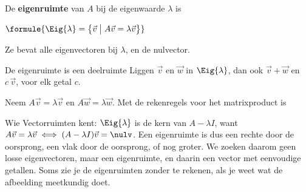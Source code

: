 \begin{theorie}
De \textbf{\textcolor{accent}{eigenruimte}} van $A$ bij de eigenwaarde $\lambda$ is

\vspace{1mm}
\qquad $\formule{\Eig{\lambda} = \bigl\{\vec v \bigm| A\vec v = \lambda\vec v\bigr\}}$

\vspace{1mm}
Ze bevat alle eigenvectoren bij $\lambda$, en de nulvector.

\begin{stelling}{De eigenruimte is een deelruimte}
Liggen $\vec v$ en $\vec w$ in $\Eig{\lambda}$, dan ook $\vec v + \vec w$ en $c\,\vec v$, voor elk getal $c$.
\end{stelling}

\begin{bewijs}
Neem $A\vec v = \lambda\vec v$ en $A\vec w = \lambda\vec w$. Met de rekenregels voor het matrixproduct is
\end{bewijs}
\end{theorie}

Wie Vectorruimten kent: $\Eig{\lambda}$ is de kern van $A - \lambda I$, want $A\vec v = \lambda\vec v \iff (A - \lambda I)\vec v = \nulv$. Een eigenruimte is dus een rechte door de oorsprong, een vlak door de oorsprong, of nog groter. We zoeken daarom geen losse eigenvectoren, maar een eigenruimte, en daarin een vector met eenvoudige getallen. Soms zie je de eigenruimten zonder te rekenen, als je weet wat de afbeelding meetkundig doet.

